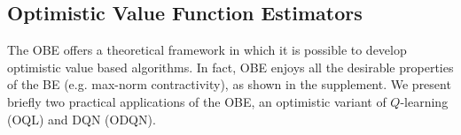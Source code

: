 \subsection{Optimistic Value Function Estimators}
The OBE offers a theoretical framework in which it is possible to develop optimistic value based algorithms. In fact, OBE enjoys all the desirable properties of the BE (e.g. max-norm contractivity), as shown in the supplement. We present briefly two practical applications of the OBE, an optimistic variant of $Q$-learning (OQL) and DQN (ODQN).
%
